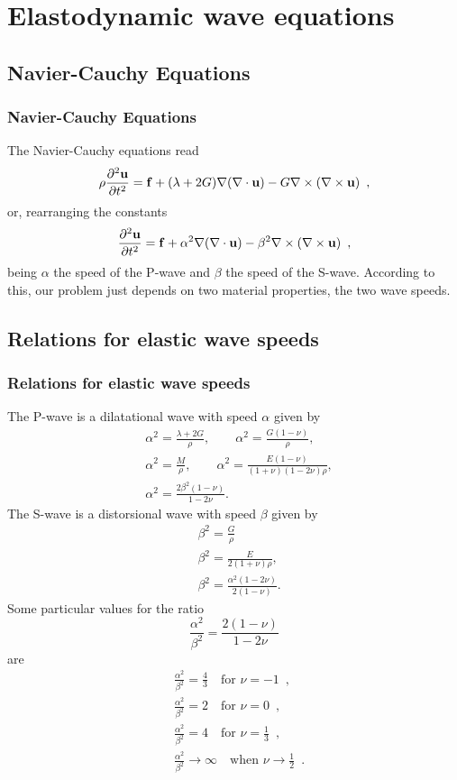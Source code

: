 \documentclass{beamer}
\newcommand{\pardiffd}[2]{\frac{\partial^2 #1}{\partial #2^2}}
\begin{document}
\section{Elastodynamic wave equations}
\subsection{Navier-Cauchy Equations}
\begin{frame}
\frametitle{Navier-Cauchy Equations}
The Navier-Cauchy equations read
\begin{equation}
\rho{ \pardiffd{\bold{u}}{t}} = \bold{f} + ( \lambda + 2G)\nabla(\nabla \cdot \bold{u}) - G\nabla \times (\nabla \times \bold{u}) \enspace ,
\label{eq:navierVec}
\end{equation}
or, rearranging the constants
\begin{equation}
 \pardiffd{\bold{u}}{t} = \bold{f} + \alpha^2\nabla(\nabla \cdot \bold{u}) - \beta^2\nabla \times (\nabla \times \bold{u}) \enspace ,
\label{eq:navierVec2}
\end{equation}
being $\alpha$ the speed of the P-wave and $\beta$ the speed of the S-wave. According to this, our problem just depends on two material properties, the two wave speeds.

\end{frame}

\subsection{Relations for elastic wave speeds}
\begin{frame}[allowframebreaks]
\frametitle{Relations for elastic wave speeds}
The P-wave is a dilatational wave with speed $\alpha$ given by 
\begin{align*}
 & \alpha^{2}=\frac{\lambda+2G}{\rho},\qquad\alpha^{2}=\frac{G(1-\nu)}{\rho},\\
 & \alpha^{2}=\frac{M}{\rho},\qquad\alpha^{2}=\frac{E(1-\nu)}{(1+\nu)(1-2\nu)\rho},\\
 & \alpha^{2}=\frac{2\beta^{2}(1-\nu)}{1-2\nu}.
\end{align*}
 The S-wave is a distorsional wave with speed $\beta$ given by 
\begin{align*}
 & \beta^{2}=\frac{G}{\rho}\\
 & \beta^{2}=\frac{E}{2(1+\nu)\rho},\\
 & \beta^{2}=\frac{\alpha^{2}(1-2\nu)}{2(1-\nu)}.
\end{align*}
 Some particular values for the ratio 
\[
\frac{\alpha^{2}}{\beta^{2}}=\frac{2(1-\nu)}{1-2\nu}
\]
 are 
\begin{align*}
 & \frac{\alpha^{2}}{\beta^{2}}=\frac{4}{3}\quad\mbox{for }\nu=-1\enspace,\\
 & \frac{\alpha^{2}}{\beta^{2}}=2\quad\mbox{for }\nu=0\enspace,\\
 & \frac{\alpha^{2}}{\beta^{2}}=4\quad\mbox{for }\nu=\frac{1}{3}\enspace,\\
 & \frac{\alpha^{2}}{\beta^{2}}\rightarrow\infty\quad\mbox{when }\nu\rightarrow\frac{1}{2}\enspace.
\end{align*}
\end{frame}
\end{document}

